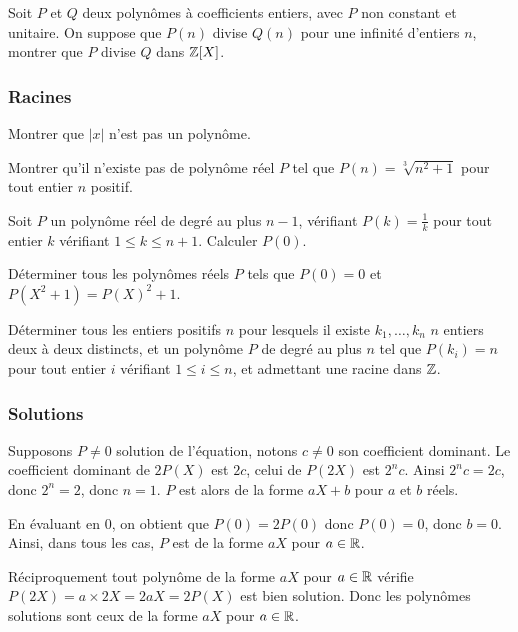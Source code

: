 \begin{exo}
Soit $P$ et $Q$ deux polynômes à coefficients entiers, avec $P$ non constant et unitaire. On suppose que $P(n)$ divise $Q(n)$ pour une infinité d'entiers $n$, montrer que $P$ divise $Q$ dans $\mathbb Z[X]$.
\end{exo}


\subsubsection{Racines}


\begin{exo}
Montrer que $|x|$ n'est pas un polynôme.
\end{exo}


\begin{exo}
Montrer qu'il n'existe pas de polynôme réel $P$ tel que $P(n) = \sqrt[3]{n^2 + 1}$ pour tout entier $n$ positif.
\end{exo}


\begin{exo}
Soit $P$ un polynôme réel de degré au plus $n - 1$, vérifiant $P(k) = \frac{1}{k}$ pour tout entier $k$ vérifiant $1\le k \le n + 1$. Calculer $P(0)$.
\end{exo}


\begin{exo}
Déterminer tous les polynômes réels $P$ tels que $P(0) = 0$ et $P(X^2 + 1) = P(X)^2 + 1$.
\end{exo}


\begin{exo}
Déterminer tous les entiers positifs $n$ pour lesquels il existe $k_1,\dots, k_n$ $n$ entiers deux à deux distincts, et un polynôme $P$ de degré au plus $n$ tel que $P(k_i) = n$ pour tout entier $i$ vérifiant $1\le i \le n$, et admettant une racine dans $\mathbb Z$.
\end{exo}


\subsubsection{Solutions}


\begin{sol}
Supposons $P\neq 0$ solution de l'équation, notons $c\neq 0$ son coefficient dominant. Le coefficient dominant de $2P(X)$ est $2c$, celui de $P(2X)$ est $2^nc$. Ainsi $2^nc = 2c$, donc $2^n = 2$, donc $n = 1$. $P$ est alors de la forme $aX + b$ pour $a$ et $b$ réels.

En évaluant en $0$, on obtient que $P(0) = 2P(0)$ donc $P(0) = 0$, donc $b = 0$. Ainsi, dans tous les cas, $P$ est de la forme $aX$ pour $a\in \mathbb R$.

Réciproquement tout polynôme de la forme $aX$ pour $a\in \mathbb R$ vérifie $P(2X) = a\times 2X = 2aX = 2P(X)$ est bien solution. Donc les polynômes solutions sont ceux de la forme $aX$ pour $a\in \mathbb R$.
\end{sol}


